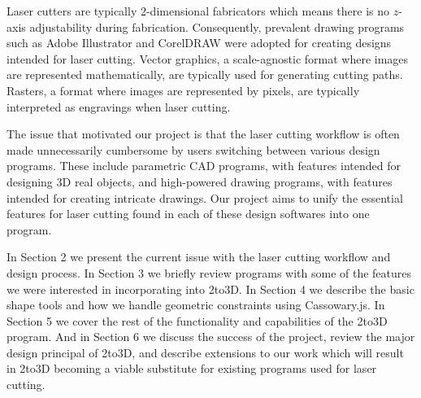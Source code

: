 Laser cutters are typically 2-dimensional fabricators which means there is no $z$-axis adjustability during fabrication. Consequently, prevalent drawing programs such as Adobe Illustrator and CorelDRAW were adopted for creating designs intended for laser cutting. Vector graphics, a scale-agnostic format where images are represented mathematically, are typically used for generating cutting paths. Rasters, a format where images are represented by pixels, are typically interpreted as engravings when laser cutting.

The issue that motivated our project is that the laser cutting workflow is often made unnecessarily cumbersome by users switching between various design programs. These include parametric CAD programs, with features intended for designing 3D real objects, and high-powered drawing programs, with features intended for creating intricate drawings. Our project aims to unify the essential features for laser cutting found in each of these design softwares into one program.

In Section 2 we present the current issue with the laser cutting workflow and design process. In Section 3 we briefly review programs with some of the features we were interested in incorporating into 2to3D. In Section 4 we describe the basic shape tools and how we handle geometric constraints using Cassowary.js. In Section 5 we cover the rest of the functionality and capabilities of the 2to3D program. And in Section 6 we discuss the success of the project, review the major design principal of 2to3D, and describe extensions to our work which will result in 2to3D becoming a viable substitute for existing programs used for laser cutting. 